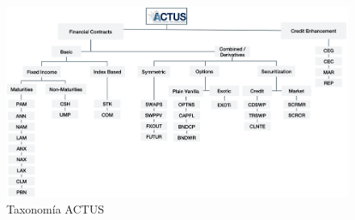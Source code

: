 \documentclass{beamer}
\begin{document}
\begin{frame}[fragile]
\begin{figure}[H]
    \centering
    \includegraphics[width=\textwidth]{ACTUS_Taxonomy.png}
    \caption{Taxonomía ACTUS}
\end{figure}

\end{frame}






\end{document}
